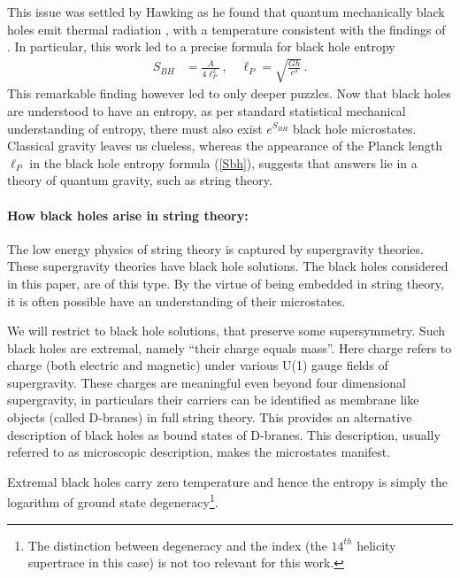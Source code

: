 \documentclass[12pt,a4paper]{JHEP3}
\newcommand{\refb}[1]{(\ref{#1})}
\begin{document}
This issue was settled by Hawking as he found that quantum mechanically black holes emit thermal radiation \cite{Hawking75}, with a temperature consistent with the findings of  \cite{BCH}. In particular, this work led to a precise formula for black hole entropy
\begin{align}
S_{BH} &= \frac{A}{4 \ell_P^2} \, , \quad  \ell_P= \sqrt{\frac{G \hbar}{c^3}} \, . \label{Sbh}
\end{align} 
This remarkable finding however led to only deeper puzzles. Now that black holes are understood to have an entropy, as  per standard statistical mechanical understanding of entropy, there must also exist $e^{S_{BH}}$ black hole  microstates. Classical gravity leaves us clueless, whereas the appearance of the Planck length $\ell_P$ in the black hole entropy formula \refb{Sbh}, suggests that answers lie in a theory of quantum gravity, such as string theory.

\paragraph{How black holes arise in string theory:}
The low energy physics of string theory is captured by supergravity theories. These supergravity theories have black hole solutions. The black holes considered in this paper, are of this type. By  the virtue of being embedded in string theory, it is often possible have an understanding of their microstates.


We will restrict to black hole solutions, that preserve some supersymmetry. Such black holes are extremal, namely ``their charge equals mass''. Here charge refers to charge (both electric and magnetic) under various U(1) gauge fields of supergravity. 
These charges are meaningful even beyond four dimensional supergravity, in particulars their carriers can be identified as membrane  like objects (called D-branes) in full string theory. This provides an alternative description of black holes as bound states of D-branes. This description, usually referred to as microscopic description, makes the microstates manifest. 

Extremal black holes carry zero temperature and hence the entropy is simply the logarithm of ground state degeneracy\footnote{The distinction between degeneracy and the index (the $14^{th}$ helicity supertrace in this case) is not too relevant for this work.}. 
\end{document}
